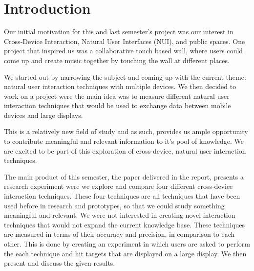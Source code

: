 \section*{Introduction}\label{sec:introduction}
Our initial motivation for this and last semester's project was our interest in Cross-Device Interaction, Natural User Interfaces (NUI), and public spaces.
One project that inspired us was a collaborative touch based wall, where users could come up and create music together by touching the wall at different places.

We started out by narrowing the subject and coming up with the current theme: natural user interaction techniques with multiple devices. 
We then decided to work on a project were the main idea was to measure different natural user interaction techniques that would be used to exchange data between mobile devices and large displays. 

This is a relatively new field of study and as such, provides us ample opportunity to contribute meaningful and relevant information to it's pool of knowledge. 
We are excited to be part of this exploration of cross-device, natural user interaction techniques. 

The main product of this semester, the paper delivered in the report, presents a research experiment were we explore and compare four different cross-device interaction techniques. 
These four techniques are all techniques that have been used before in research and prototypes, so that we could study something meaningful and relevant.
We were not interested in creating novel interaction techniques that would not expand the current knowledge base.
These techniques are measured in terms of their accuracy and precision, in comparison to each other.
This is done by creating an experiment in which users are asked to perform the each technique and hit targets that are displayed on a large display.
We then present and discuss the given results. 
